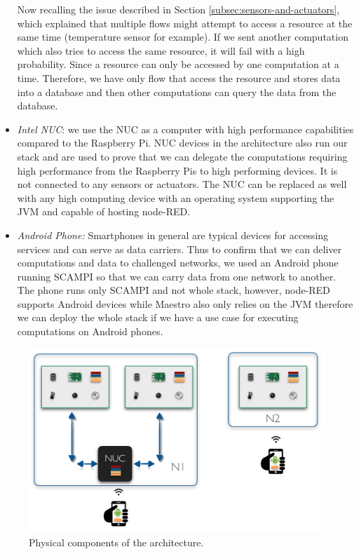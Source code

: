 \begin{itemize}
\noindent Now recalling the issue described in Section \ref{subsec:sensors-and-actuators}, which explained that multiple flows might attempt to access a resource at the same time (temperature sensor for example). If we sent another computation which also tries to access the same resource, it will fail with a high probability. Since a resource can only be accessed by one computation at a time. Therefore, we have only flow that access the resource and stores data into a database and then other computations can query the data from the database.

\item \textit{Intel NUC}: we use the NUC as a computer with high performance capabilities compared  to the Raspberry Pi. NUC devices in the architecture also run our stack and  are used to prove that we can delegate the computations requiring high performance from the Raspberry Pis to high performing devices. It is not connected to any sensors or actuators. The NUC can be replaced as well with any high computing device with an operating system supporting the JVM  and capable of hosting node-RED. 

\item\textit{Android Phone:} Smartphones in general are typical devices for accessing services and can serve as data carriers. Thus to confirm that we can deliver computations and data to challenged networks, we used an Android phone running SCAMPI so that we can carry data from one network to another. The phone runs only SCAMPI and not whole stack, however, node-RED supports Android devices while Maestro also only relies on the JVM therefore we can deploy the whole stack if we have a use case for executing computations on Android phones.

\end{itemize}


\begin{figure}[H]
	\centering
	\includegraphics[scale=0.5]{images/components.png}
	\caption{Physical components of the architecture. }
	\label{fig:components}
\end{figure}


